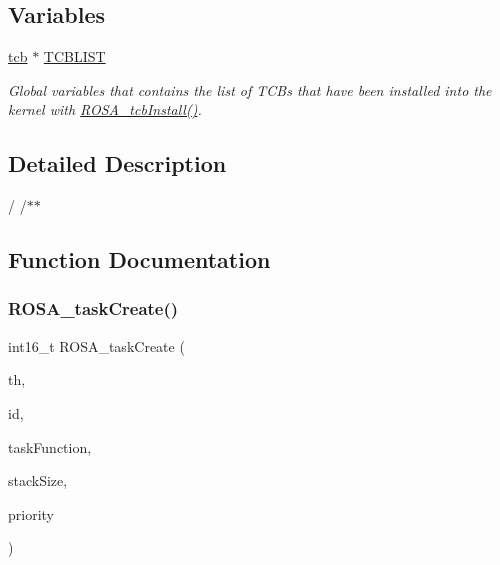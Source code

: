 \subsection*{Variables}
\begin{DoxyCompactItemize}
\item 
\mbox{\hyperlink{structtcb__record__t}{tcb}} $\ast$ \mbox{\hyperlink{group__rosa__kernel__module_ga5235b1f3c05638da958e7832f223e19c}{T\+C\+B\+L\+I\+ST}}
\begin{DoxyCompactList}\small\item\em Global variables that contains the list of T\+CB\textquotesingle{}s that have been installed into the kernel with \mbox{\hyperlink{group__rosa__kernel__module_ga9a7bde19bc8609de66353d1f51d09eda}{R\+O\+S\+A\+\_\+tcb\+Install()}}. \end{DoxyCompactList}\end{DoxyCompactItemize}


\subsection{Detailed Description}
/ /$\ast$$\ast$ 

\subsection{Function Documentation}
\mbox{\label{group__rosa__kernel__module_ga7b9542dcdbdadbfc94f42f85536a83b0}} 
\subsubsection{\texorpdfstring{R\+O\+S\+A\+\_\+task\+Create()}{ROSA\_taskCreate()}}
{\footnotesize\ttfamily int16\+\_\+t R\+O\+S\+A\+\_\+task\+Create (\begin{DoxyParamCaption}\item[{\mbox{\hyperlink{structtcb__record__t}{R\+O\+S\+A\+\_\+task\+Handle\+\_\+t}} $\ast$$\ast$}]{th,  }\item[{char $\ast$}]{id,  }\item[{void $\ast$}]{task\+Function,  }\item[{uint32\+\_\+t}]{stack\+Size,  }\item[{uint8\+\_\+t}]{priority }\end{DoxyParamCaption})}



